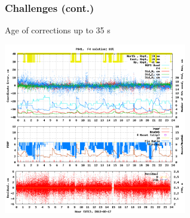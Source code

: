 \documentclass[10pt]{beamer}
\begin{document}

\begin{frame}
  \frametitle{Challenges (cont.)}
  \begin{block}{Age of corrections up to 35 s}
  \begin{center}
    \includegraphics[width=0.6\textwidth]{age2.png}
  \end{center}
  \end{block}
\end{frame}

\end{document}
